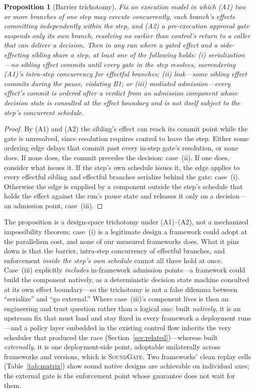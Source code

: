 \documentclass[10pt,journal,compsoc]{IEEEtran}
\newtheorem{proposition}{Proposition}
\newcommand{\sys}{\textsc{SoundGate}}
\begin{document}
\begin{proposition}[Barrier trichotomy]\label{prop:trichotomy}
Fix an execution model in which \textup{(A1)} two or more branches of one step
may execute concurrently, each branch's effects committing independently
within the step, and \textup{(A2)} a pre-execution approval gate suspends only
its own branch, resolving no earlier than control's return to a caller that
can deliver a decision. Then in any run where a gated effect and a
side-effecting sibling share a step, at least one of the following holds:
\textup{(i)} \emph{serialization}---no sibling effect commits until every gate
in the step resolves, surrendering \textup{(A1)}'s intra-step concurrency for
effectful branches; \textup{(ii)} \emph{leak}---some sibling effect commits
during the pause, violating B1; or \textup{(iii)} \emph{mediated
admission}---every effect's commit is ordered after a verdict from an
admission component whose decision state is consulted at the effect boundary
and is not itself subject to the step's concurrent schedule.
\end{proposition}

\begin{proof}
By (A1) and (A2) the sibling's effect can reach its commit point while the
gate is unresolved, since resolution requires control to leave the step.
Either some ordering edge delays that commit past every in-step gate's
resolution, or none does. If none does, the commit precedes the decision:
case~(ii). If one does, consider what issues it. If the step's own schedule
issues it, the edge applies to every effectful sibling and effectful branches
serialize behind the gate: case~(i). Otherwise the edge is supplied by a
component outside the step's schedule that holds the effect against the run's
pause state and releases it only on a decision---an admission point, case~(iii).
\end{proof}

The proposition is a design-space trichotomy under (A1)--(A2), not a
mechanized impossibility theorem: case~(i) is a legitimate design a framework
could adopt at the parallelism cost, and none of our measured frameworks does.
What it pins down is that the barrier, intra-step concurrency of effectful
branches, and enforcement \emph{inside the step's own schedule} cannot all
three hold at once. Case~(iii) explicitly \emph{includes} in-framework
admission points---a framework could build the component natively, as a
deterministic decision state machine consulted at its own effect
boundary---so the trichotomy is not a false dilemma between ``serialize'' and
``go external.'' Where case~(iii)'s component lives is then an engineering
and trust question rather than a logical one: built \emph{natively}, it is an
upstream fix that must land and stay fixed in every framework a deployment
runs---and a policy layer embedded in the existing control flow inherits the
very scheduler that produced the race (Section~\ref{sec:related})---whereas
built \emph{externally}, it is one deployment-side point, adoptable
unilaterally across frameworks and versions, which is \sys{}. Two frameworks'
clean replay cells (Table~\ref{tab:matrix}) show sound native designs are
achievable on individual axes; the external gate is the enforcement point
whose guarantee does not wait for them.
\end{document}
